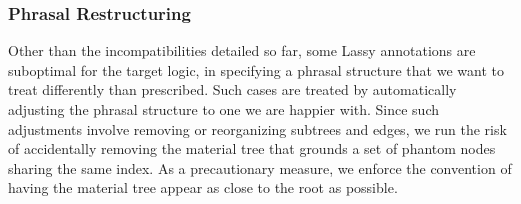 \subsubsection{Phrasal Restructuring}
Other than the incompatibilities detailed so far, some Lassy annotations are suboptimal for the target logic, in specifying a phrasal structure that we want to treat differently than prescribed.
Such cases are treated by automatically adjusting the phrasal structure to one we are happier with.
Since such adjustments involve removing or reorganizing subtrees and edges, we run the risk of accidentally removing the material tree that grounds a set of phantom nodes sharing the same index.
As a precautionary measure, we enforce the convention of having the material tree appear as close to the root as possible.

